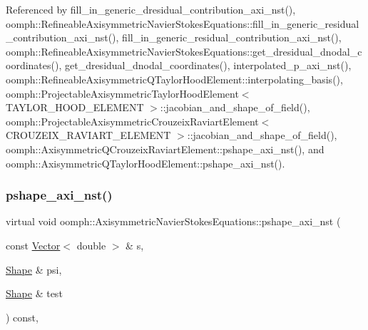 Referenced by fill\+\_\+in\+\_\+generic\+\_\+dresidual\+\_\+contribution\+\_\+axi\+\_\+nst(), oomph\+::\+Refineable\+Axisymmetric\+Navier\+Stokes\+Equations\+::fill\+\_\+in\+\_\+generic\+\_\+residual\+\_\+contribution\+\_\+axi\+\_\+nst(), fill\+\_\+in\+\_\+generic\+\_\+residual\+\_\+contribution\+\_\+axi\+\_\+nst(), oomph\+::\+Refineable\+Axisymmetric\+Navier\+Stokes\+Equations\+::get\+\_\+dresidual\+\_\+dnodal\+\_\+coordinates(), get\+\_\+dresidual\+\_\+dnodal\+\_\+coordinates(), interpolated\+\_\+p\+\_\+axi\+\_\+nst(), oomph\+::\+Refineable\+Axisymmetric\+Q\+Taylor\+Hood\+Element\+::interpolating\+\_\+basis(), oomph\+::\+Projectable\+Axisymmetric\+Taylor\+Hood\+Element$<$ T\+A\+Y\+L\+O\+R\+\_\+\+H\+O\+O\+D\+\_\+\+E\+L\+E\+M\+E\+N\+T $>$\+::jacobian\+\_\+and\+\_\+shape\+\_\+of\+\_\+field(), oomph\+::\+Projectable\+Axisymmetric\+Crouzeix\+Raviart\+Element$<$ C\+R\+O\+U\+Z\+E\+I\+X\+\_\+\+R\+A\+V\+I\+A\+R\+T\+\_\+\+E\+L\+E\+M\+E\+N\+T $>$\+::jacobian\+\_\+and\+\_\+shape\+\_\+of\+\_\+field(), oomph\+::\+Axisymmetric\+Q\+Crouzeix\+Raviart\+Element\+::pshape\+\_\+axi\+\_\+nst(), and oomph\+::\+Axisymmetric\+Q\+Taylor\+Hood\+Element\+::pshape\+\_\+axi\+\_\+nst().

\mbox{\label{classoomph_1_1AxisymmetricNavierStokesEquations_a19a4135581356bf368a7ecae2b315f85}} 
\subsubsection{\texorpdfstring{pshape\+\_\+axi\+\_\+nst()}{pshape\_axi\_nst()}\hspace{0.1cm}{\footnotesize\ttfamily [2/2]}}
{\footnotesize\ttfamily virtual void oomph\+::\+Axisymmetric\+Navier\+Stokes\+Equations\+::pshape\+\_\+axi\+\_\+nst (\begin{DoxyParamCaption}\item[{const \hyperlink{classoomph_1_1Vector}{Vector}$<$ double $>$ \&}]{s,  }\item[{\hyperlink{classoomph_1_1Shape}{Shape} \&}]{psi,  }\item[{\hyperlink{classoomph_1_1Shape}{Shape} \&}]{test }\end{DoxyParamCaption}) const\hspace{0.3cm}{\ttfamily [protected]}, {}}



